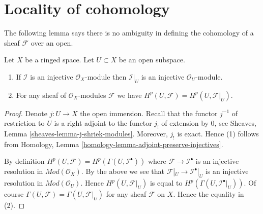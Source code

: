 \section{Locality of cohomology}
\label{section-locality}

\noindent
The following lemma says there is no ambiguity in defining the cohomology
of a sheaf $\mathcal{F}$ over an open.

\begin{lemma}
\label{lemma-cohomology-of-open}
Let $X$ be a ringed space.
Let $U \subset X$ be an open subspace.
\begin{enumerate}
\item If $\mathcal{I}$ is an injective $\mathcal{O}_X$-module
then $\mathcal{I}|_U$ is an injective $\mathcal{O}_U$-module.
\item For any sheaf of $\mathcal{O}_X$-modules $\mathcal{F}$ we have
$H^p(U, \mathcal{F}) = H^p(U, \mathcal{F}|_U)$.
\end{enumerate}
\end{lemma}

\begin{proof}
Denote $j : U \to X$ the open immersion.
Recall that the functor $j^{-1}$ of restriction to $U$ is a right adjoint
to the functor $j_!$ of extension by $0$, see
Sheaves, Lemma \ref{sheaves-lemma-j-shriek-modules}.
Moreover, $j_!$ is exact. Hence (1) follows from
Homology, Lemma \ref{homology-lemma-adjoint-preserve-injectives}.

\medskip\noindent
By definition $H^p(U, \mathcal{F}) = H^p(\Gamma(U, \mathcal{I}^\bullet))$
where $\mathcal{F} \to \mathcal{I}^\bullet$ is an injective resolution
in $\textit{Mod}(\mathcal{O}_X)$.
By the above we see that $\mathcal{F}|_U \to \mathcal{I}^\bullet|_U$
is an injective resolution in $\textit{Mod}(\mathcal{O}_U)$.
Hence $H^p(U, \mathcal{F}|_U)$ is equal to
$H^p(\Gamma(U, \mathcal{I}^\bullet|_U))$.
Of course $\Gamma(U, \mathcal{F}) = \Gamma(U, \mathcal{F}|_U)$ for
any sheaf $\mathcal{F}$ on $X$.
Hence the equality
in (2).
\end{proof}

